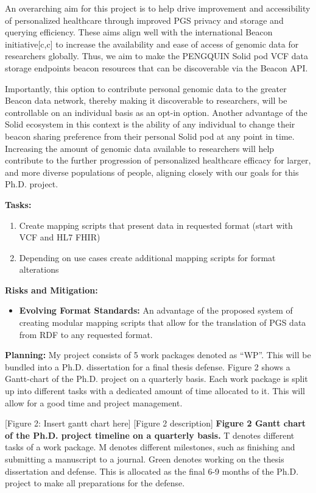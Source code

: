 \documentclass[11pt]{article}
\begin{document}
An overarching aim for this project is to help drive improvement and accessibility of personalized healthcare through improved PGS privacy and storage and querying efficiency. 
These aims align well with the international Beacon initiative[c,c] to increase the availability and ease of access of genomic data for researchers globally. 
Thus, we aim to make the PENGQUIN Solid pod VCF data storage endpoints beacon resources that can be discoverable via the Beacon API.

Importantly, this option to contribute personal genomic data to the greater Beacon data network, thereby making it discoverable to researchers, will be controllable on an individual basis as an opt-in option. 
Another advantage of the Solid ecosystem in this context is the ability of any individual to change their beacon sharing preference from their personal Solid pod at any point in time. 
Increasing the amount of genomic data available to researchers will help contribute to the further progression of personalized healthcare efficacy for larger, and more diverse populations of people, aligning closely with our goals for this Ph.D. project.

\textbf{Tasks:} 
\begin{enumerate}
	\item Create mapping scripts that present data in requested format (start with VCF and HL7 FHIR)
	\item Depending on use cases create additional mapping scripts for format alterations
\end{enumerate}

\textbf{Risks and Mitigation:} 
\begin{itemize}
	\item \textbf{Evolving Format Standards:} An advantage of the proposed system of creating modular mapping scripts that allow for the translation of PGS data from RDF to any requested format. 
\end{itemize}

\textbf{Planning:}
My project consists of 5 work packages denoted as “WP”. 
This will be bundled into a Ph.D. dissertation for a final thesis defense. Figure 2 shows a Gantt-chart of the Ph.D. project on a quarterly basis.  
Each work package is split up into different tasks with a dedicated amount of time allocated to it. 
This will allow for a good time and project management. 

[Figure 2: Insert gantt chart here]
[Figure 2 description]
\textbf{Figure 2 Gantt chart of the Ph.D. project timeline on a quarterly basis.} T denotes different tasks of a work package. M denotes different milestones, such as finishing and submitting a manuscript to a journal. 
Green denotes working on the thesis dissertation and defense. 
This is allocated as the final 6-9 months of the Ph.D. project to make all preparations for the defense. 
\end{document}
